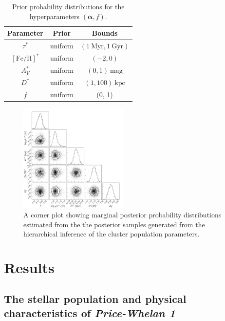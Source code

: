 \documentclass[twocolumn]{aastex62}
\newcommand{\bs}[1]{\boldsymbol{#1}}
\newcommand{\kpc}{\textrm{kpc}}
\newcommand{\feh}{\ensuremath{[\textrm{Fe} / \textrm{H}]}}
\newcommand{\clustername}{\textsl{Price-Whelan 1}}
\begin{document}
\begin{table}[ht]
\begin{center}
    \begin{tabular}{ c | c | c }
        \toprule
        Parameter & Prior & Bounds \\
        \toprule
        $\tau^*$ & uniform & $(1~\textrm{Myr}, 1~\textrm{Gyr})$ \\
        $\feh^*$ & uniform & $(-2, 0)$ \\
        $A_V^*$ & uniform & $(0, 1)~\textrm{mag}$ \\
        $D^*$ & uniform & $(1, 100)~\kpc$ \\
        $f$ & uniform & (0, 1) \\
        \toprule
    \end{tabular}
\caption{Prior probability distributions for the hyperparameters $(\bs{\alpha}, f)$.
\label{tbl:hyperpriors}}
\end{center}
\end{table}


\begin{figure}
\centering
\includegraphics[width=0.48\textwidth]{figures/hierarch-corner.pdf}
\caption{A corner plot showing marginal posterior probability distributions estimated from the the posterior samples generated from the hierarchical inference of the cluster population parameters.}
\label{fig:hierarch-corner}
\end{figure}


\section{Results} \label{sec:results}

\subsection{The stellar population and physical characteristics of \clustername}
\label{sec:popchars}
\end{document}
